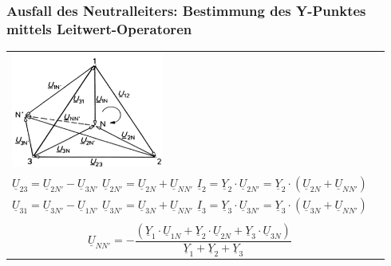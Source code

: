         \subsubsection{Ausfall des Neutralleiters: Bestimmung des Y-Punktes mittels Leitwert-Operatoren}
            \begin{tabular}{p{5cm}p{13cm}}
            	\begin{minipage}{8cm}
                	\includegraphics[width=5cm]{bilder/ZeigerdarstellungVerschobenerSternpunkt.png}
                \end{minipage} &
				\begin{minipage}{13cm}
                	$\underline{U}_{12} = \underline{U}_{1N'} - \underline{U}_{2N'}$ \hspace{0.3cm}
                	$\underline{U}_{1N'} = \underline{U}_{1N} + \underline{U}_{NN'}$ \hspace{0.3cm}
                	$\underline{I}_1 = \underline{Y}_1 \cdot \underline{U}_{1N'} = \underline{Y}_1 \cdot (\underline{U}_{1N} + \underline{U}_{NN'})$ \\
                	$\underline{U}_{23} = \underline{U}_{2N'} - \underline{U}_{3N'}$ \hspace{0.3cm}
                	$\underline{U}_{2N'} = \underline{U}_{2N} + \underline{U}_{NN'}$ \hspace{0.3cm}
                	$\underline{I}_2 = \underline{Y}_2 \cdot \underline{U}_{2N'} = \underline{Y}_2
                	\cdot (\underline{U}_{2N} + \underline{U}_{NN'})$ \\ $\underline{U}_{31} = \underline{U}_{3N'} - \underline{U}_{1N'}$ \hspace{0.3cm}
                	$\underline{U}_{3N'} = \underline{U}_{3N} + \underline{U}_{NN'}$ \hspace{0.3cm}
                	$\underline{I}_3 = \underline{Y}_3 \cdot \underline{U}_{3N'} = \underline{Y}_3
                	\cdot (\underline{U}_{3N} + \underline{U}_{NN'})$ \\ \\ 
                	$$\underline{U}_{NN'} = \boldsymbol{-} \frac{(\underline{Y}_1 \cdot
                	\underline{U}_{1N} + \underline{Y}_2 \cdot \underline{U}_{2N} + \underline{Y}_3 \cdot
                	\underline{U}_{3N})}{\underline{Y}_1 + \underline{Y}_2 +
                	\underline{Y}_3}$$
                \end{minipage}
			\end{tabular}

